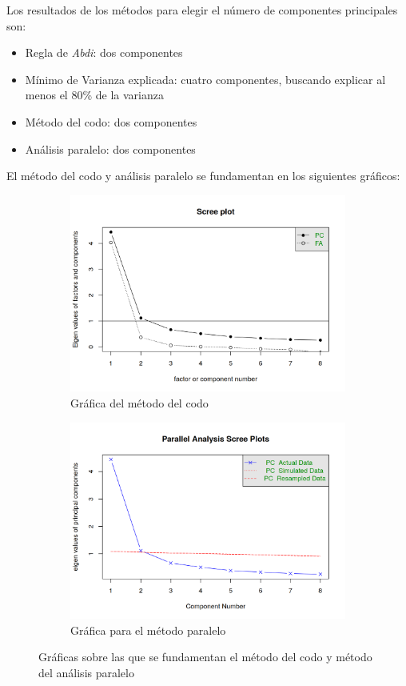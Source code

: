 \documentclass[11pt]{article}
\begin{document}
Los resultados de los métodos para elegir el número de componentes principales son:

\begin{itemize}
    \item Regla de \textit{Abdi}: dos componentes
    \item Mínimo de Varianza explicada: cuatro componentes, buscando explicar al menos el 80\% de la varianza
    \item Método del codo: dos componentes
    \item Análisis paralelo: dos componentes
\end{itemize}

El método del codo y análisis paralelo se fundamentan en los siguientes gráficos:

\begin{figure}[H]
    \centering
    \begin{subfigure}{0.45\textwidth}
        \includegraphics[width=1.0\textwidth]{pca_codo}
        \caption{Gráfica del método del codo}
    \end{subfigure}
    \begin{subfigure}{0.45\textwidth}
        \includegraphics[width=1.0\textwidth]{pca_paralelo}
        \caption{Gráfica para el método paralelo}
    \end{subfigure}

    \caption{Gráficas sobre las que se fundamentan el método del codo y método del análisis paralelo}
\end{figure}
\end{document}
